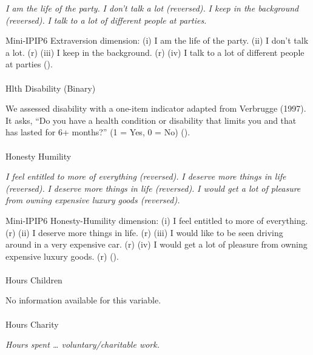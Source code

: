\documentclass[
  single column]{article}
\makeatletter
\let\oldparagraph\paragraph
\renewcommand{\paragraph}{
    \@ifstar
      \xxxParagraphStar
      \xxxParagraphNoStar
  }
\newcommand{\xxxParagraphStar}[1]{\oldparagraph*{#1}\mbox{}}
\newcommand{\xxxParagraphNoStar}[1]{\oldparagraph{#1}\mbox{}}
\makeatother
\begin{document}
\emph{I am the life of the party.} \emph{I don't talk a lot (reversed).}
\emph{I keep in the background (reversed).} \emph{I talk to a lot of
different people at parties.}

Mini-IPIP6 Extraversion dimension: (i) I am the life of the party. (ii)
I don't talk a lot. (r) (iii) I keep in the background. (r) (iv) I talk
to a lot of different people at parties
().

\paragraph{Hlth Disability (Binary)}\label{hlth-disability-binary}

We assessed disability with a one-item indicator adapted from Verbrugge
(1997). It asks, ``Do you have a health condition or disability that
limits you and that has lasted for 6+ months?'' (1 = Yes, 0 = No)
().

\paragraph{Honesty Humility}\label{honesty-humility}

\emph{I feel entitled to more of everything (reversed).} \emph{I deserve
more things in life (reversed).} \emph{I deserve more things in life
(reversed).} \emph{I would get a lot of pleasure from owning expensive
luxury goods (reversed).}

Mini-IPIP6 Honesty-Humility dimension: (i) I feel entitled to more of
everything. (r) (ii) I deserve more things in life. (r) (iii) I would
like to be seen driving around in a very expensive car. (r) (iv) I would
get a lot of pleasure from owning expensive luxury goods. (r)
().

\paragraph{Hours Children}\label{hours-children}

No information available for this variable.

\paragraph{Hours Charity}\label{hours-charity}

\emph{Hours spent \ldots{} voluntary/charitable work.}
\end{document}
